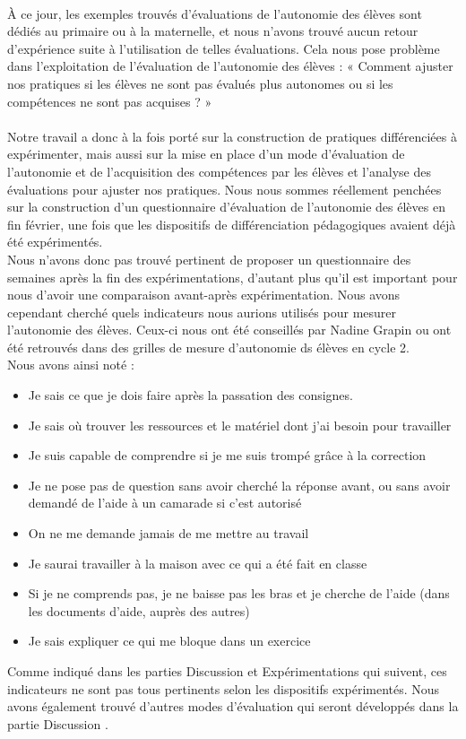 \paragraph{}À ce jour, les exemples trouvés d’évaluations de l’autonomie des élèves sont dédiés au primaire ou à la maternelle\cite{pedagogie_cooperative_hierarchie}, et nous n’avons trouvé aucun retour d’expérience suite à l’utilisation de telles évaluations. Cela nous pose problème dans l’exploitation de l’évaluation de l’autonomie des élèves : « Comment ajuster nos pratiques si les élèves ne sont pas évalués plus autonomes ou si les compétences ne sont pas acquises ? »

\paragraph{}Notre travail a donc à la fois porté sur la construction de pratiques différenciées à expérimenter, mais aussi sur la mise en place d’un mode d’évaluation de l’autonomie et de l’acquisition des compétences par les élèves et l’analyse des évaluations pour ajuster nos pratiques. Nous nous sommes réellement penchées sur la construction d'un questionnaire d'évaluation de l'autonomie des élèves en fin février, une fois que les dispositifs de différenciation pédagogiques avaient déjà été expérimentés.\\
Nous n'avons donc pas trouvé pertinent de proposer un questionnaire des semaines après la fin des expérimentations, d'autant plus qu'il est important pour nous d'avoir une comparaison avant-après expérimentation. Nous avons cependant cherché quels indicateurs nous aurions utilisés pour mesurer l'autonomie des élèves. Ceux-ci nous ont été conseillés par Nadine Grapin ou ont été retrouvés dans des grilles de mesure d'autonomie ds élèves en cycle 2\cite{Grille_autonomie}.\\
Nous avons ainsi noté :
\begin{itemize}
	\item \og Je sais ce que je dois faire après la passation des
	consignes.\fg{}
	\item \og Je sais où trouver les ressources et le matériel dont j'ai besoin pour travailler \fg{}
	\item \og Je suis capable de comprendre si je me suis trompé grâce à la correction \fg{}
	\item \og Je ne pose pas de question sans avoir cherché la réponse avant, ou sans avoir demandé de l'aide à un camarade si c'est autorisé \fg{}
	\item \og On ne me demande jamais de me mettre au travail \fg{}
	\item \og Je saurai travailler à la maison avec ce qui a été fait en classe \fg{}
	\item \og Si je ne comprends pas, je ne baisse pas les bras et je cherche de l'aide (dans les documents d'aide, auprès des autres) \fg{}
	\item \og Je sais expliquer ce qui me bloque dans un exercice \fg{}
\end{itemize}
Comme indiqué dans les parties \og Discussion \fg{} et \og Expérimentations \fg{} qui suivent, ces indicateurs ne sont pas tous pertinents selon les dispositifs expérimentés. Nous avons également trouvé d'autres modes d'évaluation qui seront développés dans la partie \og Discussion \fg{}.